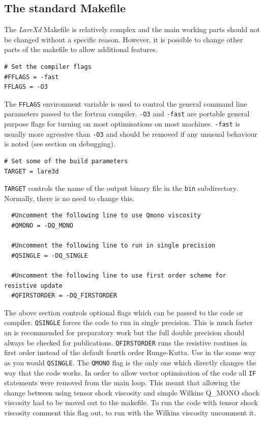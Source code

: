 \documentclass[11pt]{article}
\begin{document}
\subsection{The standard Makefile}
The {\it LareXd} Makefile is relatively complex and the main working parts should not be changed without a specific reason. However, it is possible to change other parts of the makefile to allow additional features.\\
\begin{verbatim}
# Set the compiler flags
#FFLAGS = -fast
FFLAGS = -O3
\end{verbatim}
The \texttt{FFLAGS} environment variable is used to control the general command line parameters passed to the fortran compiler. \texttt{-O3} and \texttt{-fast} are portable general purpose flags for turning on most optimisations on most machines. \texttt{-fast} is usually more agressive than \texttt{-O3} and should be removed if any unusual behaviour is noted (see section on debugging).
\begin{verbatim}
# Set some of the build parameters
TARGET = lare3d
\end{verbatim}
\texttt{TARGET} controls the name of the output binary
file in the \texttt{bin} subdirectory. Normally, there is no need to change this.
\begin{verbatim}
  #Uncomment the following line to use Qmono viscosity
  #QMONO = -DQ_MONO

  #Uncomment the following line to run in single precision
  #QSINGLE = -DQ_SINGLE

  #Uncomment the following line to use first order scheme for resistive update
  #QFIRSTORDER = -DQ_FIRSTORDER
\end{verbatim}
The above section controls optional flags which can be passed to the code or compiler. \texttt{QSINGLE} forces the code to run in single precision. This is much faster an is recommended for preparatory work but the full double precision should always be checked for publications. \texttt{QFIRSTORDER} runs the resistive routines in first order instead of the default fourth order Runge-Kutta. Use in the same way as you would \texttt{QSINGLE}.
The \texttt{QMONO} flag is the only one which directly changes the way that the code works. In order to allow vector optimisation of the code all \texttt{IF} statements were removed from the main loop. This meant that allowing the change between using tensor shock viscosity and simple Wilkins Q\_MONO shock viscosity had to be moved out to the makefile. To run the code with tensor shock viscosity comment this flag out, to run with the Wilkins viscosity uncomment it.
\end{document}
